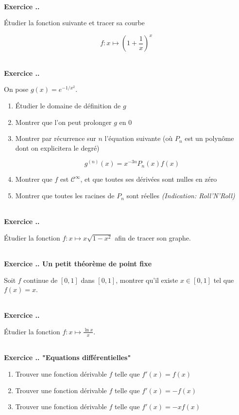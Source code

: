 \documentclass{article}
\newcounter{exo}
\newcommand{\exercice}[1][\null]{\textbf{\\ Exercice \thesection.\theexo. #1} \addtocounter{exo}{1}}
\begin{document}
\exercice

Étudier la fonction suivante et tracer sa courbe 

\begin{equation*}
    f : x \mapsto \left(1 + \frac{1}{x}\right)^x
\end{equation*}

\exercice

On pose $g(x) = e^{-1/x^2}$.

\begin{enumerate}
    \item Étudier le domaine de définition de $g$
    \item Montrer que l'on peut prolonger $g$ en $0$
    \item Montrer par récurrence sur $n$ l'équation suivante 
        (où $P_n$ est un polynôme dont on explicitera 
        le degré)

        \begin{equation*}
            g^{(n)} (x) = x^{-3n} P_n (x) f(x) 
        \end{equation*}

    \item Montrer que $f$ est $\mathcal{C}^\infty$, 
        et que toutes ses dérivées sont nulles en zéro

    \item Montrer que toutes les racines de $P_n$ sont 
        réelles \emph{(Indication: Roll'N'Roll)}
\end{enumerate}


\exercice 

Étudier la fonction $f : x \mapsto x \sqrt{1 - x^2}$
afin de tracer son graphe.

\exercice[Un petit théorème de point fixe]

Soit $f$ continue de $ [0,1] $ dans $[0,1]$, montrer qu'il existe 
$x \in [0,1]$ tel que $f(x) = x$.

\exercice

Étudier la fonction $f : x \mapsto \frac{\ln x }{x}$.


\exercice["Equations différentielles"]

\begin{enumerate}
    \item Trouver une fonction dérivable $f$ telle que $f'(x) = f(x)$
    \item Trouver une fonction dérivable $f$ telle que 
        $f'(x) = - f (x)$
    \item Trouver une fonction dérivable $f$ telle que 
        $f'(x) = -x f(x)$
\end{enumerate}
\end{document}
